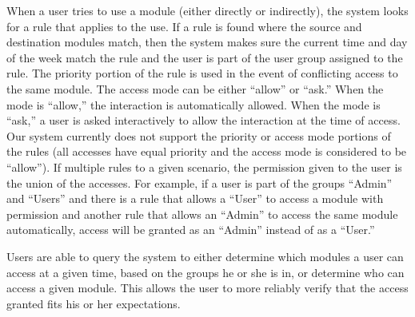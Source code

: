 When a user tries to use a module (either directly or indirectly), the system
looks for a rule that applies to the use. If a rule is found where the source
and destination modules match, then the system makes sure the current time and
day of the week match the rule and the user is part of the user group assigned
to the rule. The priority portion of the rule is used in the event of
conflicting access to the same module. The access mode can be either ``allow''
or ``ask.'' When the mode is ``allow,'' the interaction is automatically
allowed. When the mode is ``ask,'' a user is asked interactively to allow the
interaction at the time of access. Our system currently does not support the
priority or access mode portions of the rules (all accesses have equal priority
and the access mode is considered to be ``allow''). If multiple rules to a given
scenario, the permission given to the user is the union of the accesses.  For
example, if a user is part of the groups ``Admin'' and ``Users'' and there is a
rule that allows a ``User'' to access a module with permission and another rule
that allows an ``Admin'' to access the same module automatically, access will be
granted as an ``Admin'' instead of as a ``User.''

Users are able to query the system to either determine which modules a user can
access at a given time, based on the groups he or she is in, or determine who
can access a given module. This allows the user to more reliably verify that the
access granted fits his or her expectations.
